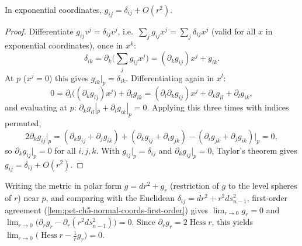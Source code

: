 \begin{lemma}
  \label{lem:pet-ch5-normal-coords-first-order}
  In exponential coordinates, $g_{ij}=\delta_{ij}+O(r^2)$.
\end{lemma}
\begin{proof}
  Differentiate $g_{ij}v^j=\delta_{ij}v^j$, i.e.\ $\sum_jg_{ij}x^j=\sum_j\delta_{ij}x^j$
  (valid for all $x$ in exponential coordinates), once in $x^k$:
  \[
    \delta_{ik}=\partial_k\Big(\sum_jg_{ij}x^j\Big)=(\partial_kg_{ij})x^j+g_{ik}.
  \]
  At $p$ ($x^j=0$) this gives $g_{ik}|_p=\delta_{ik}$. Differentiating again in
  $x^l$:
  \[
    0=\partial_l\big((\partial_kg_{ij})x^j\big)+\partial_lg_{ik}
    =(\partial_l\partial_kg_{ij})x^j+\partial_kg_{il}+\partial_lg_{ik},
  \]
  and evaluating at $p$: $\partial_kg_{il}|_p+\partial_lg_{ik}|_p=0$. Applying this
  three times with indices permuted,
  \[
    2\partial_kg_{ij}|_p=(\partial_kg_{ij}+\partial_jg_{ik})+(\partial_kg_{ij}+\partial_ig_{jk})
    -(\partial_ig_{jk}+\partial_jg_{ik})\Big|_p=0,
  \]
  so $\partial_kg_{ij}|_p=0$ for all $i,j,k$. With $g_{ij}|_p=\delta_{ij}$ and
  $\partial_kg_{ij}|_p=0$, Taylor's theorem gives $g_{ij}=\delta_{ij}+O(r^2)$.
\end{proof}

\begin{remark}
  \label{rem:pet-ch5-hessian-r-asymptotics}
  Writing the metric in polar form $g=dr^2+g_r$ (restriction of $g$ to the level
  spheres of $r$) near $p$, and comparing with the Euclidean
  $\delta_{ij}=dr^2+r^2ds_{n-1}^2$, first-order agreement
  (\cref{lem:pet-ch5-normal-coords-first-order}) gives $\lim_{r\to0}g_r=0$ and
  $\lim_{r\to0}\big(\partial_rg_r-\partial_r(r^2ds_{n-1}^2)\big)=0$. Since
  $\partial_rg_r=2\operatorname{Hess}r$, this yields
  $\lim_{r\to0}\big(\operatorname{Hess}r-\tfrac1rg_r\big)=0$.
\end{remark}

